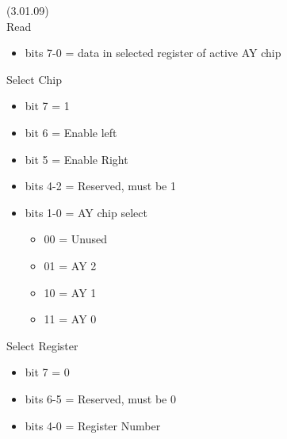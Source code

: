  (3.01.09)\\
Read
\begin{itemize}
\item[] bits 7-0 = data in selected register of active AY chip
\end{itemize}
Select Chip
\begin{itemize}
\item[] bit 7 = 1
\item[] bit 6 = Enable left
\item[] bit 5 = Enable Right
\item[] bits 4-2 = Reserved, must be 1
\item[] bits 1-0 = AY chip select
  \begin{itemize}
  \item[] 00 = Unused
  \item[] 01 = AY 2
  \item[] 10 = AY 1
  \item[] 11 = AY 0
  \end{itemize}
\end{itemize}
Select Register
\begin{itemize}
\item[] bit 7 = 0
\item[] bits 6-5 = Reserved, must be 0
\item[] bits 4-0 = Register Number
\end{itemize}


